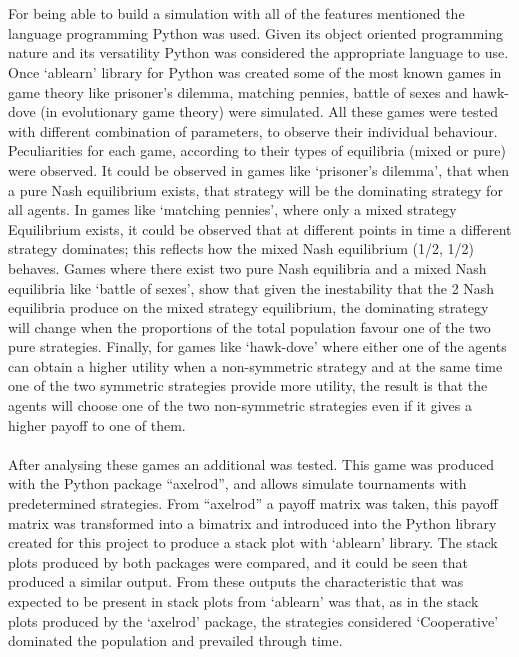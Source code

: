 \\\\For being able to build a simulation with all of the features mentioned the language programming Python was used. Given its object oriented programming nature and its versatility Python was considered the appropriate language to use. Once `ablearn' library for Python was created some of the most known games in game theory like prisoner's dilemma, matching pennies, battle of sexes and hawk-dove (in evolutionary game theory) were simulated. All these games were tested with different combination of parameters, to observe their individual behaviour. Peculiarities for each game, according to their types of equilibria (mixed or pure) were observed. It could be observed in games like `prisoner's dilemma', that when a pure Nash equilibrium exists, that strategy will be the dominating strategy for all agents. In games like `matching pennies', where only a mixed strategy Equilibrium exists, it could be observed that at different points in time a different strategy dominates; this reflects how the mixed Nash equilibrium (1/2, 1/2) behaves. Games where there exist two pure Nash equilibria and a mixed Nash equilibria like `battle of sexes', show that given the inestability that the 2 Nash equilibria produce on the mixed strategy equilibrium, the dominating strategy will change when the proportions of the total population favour one of the two pure strategies. Finally, for games like `hawk-dove' where either one of the agents can obtain a higher utility when a non-symmetric strategy and at the same time one of the two symmetric strategies provide more utility, the result is that the agents will choose one of the two non-symmetric strategies even if it gives a higher payoff to one of them. 
\\\\After analysing these games an additional was tested. This game was produced with the Python package ``axelrod'', and allows simulate tournaments with predetermined strategies. From ``axelrod'' a payoff matrix was taken, this payoff matrix was transformed into a bimatrix and introduced into the Python library created for this project to produce a stack plot with `ablearn' library. The stack plots produced by both packages were compared, and it could be seen that produced a similar output. From these outputs the characteristic that was expected to be present in stack plots from `ablearn' was that, as in the stack plots produced by the `axelrod' package, the strategies considered `Cooperative' dominated the population and prevailed through time.